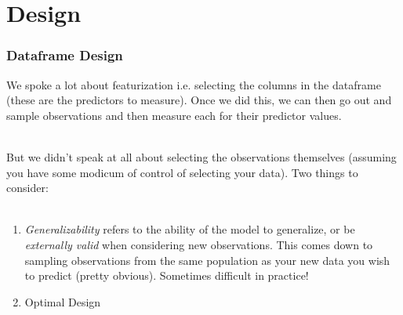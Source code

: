 \documentclass[handout]{beamer}
\begin{document}
\section{Design}

\begin{frame}\frametitle{Dataframe Design}

We spoke a lot about featurization i.e. selecting the columns in the dataframe (these are the predictors to measure). Once we did this, we can then go out and sample observations and then measure each for their predictor values. \\~\\ \pause

But we didn't speak at all about selecting the observations themselves (assuming you have some modicum of control of selecting your data). Two things to consider: \\~\\  \pause

\begin{enumerate}
\item \emph{Generalizability} refers to the ability of the model to generalize, or be \emph{externally valid} when considering new observations. This comes down to sampling observations from the same population as your new data you wish to predict (pretty obvious). Sometimes difficult in practice! \pause
\item Optimal Design
\end{enumerate}

\end{frame}
\end{document}
